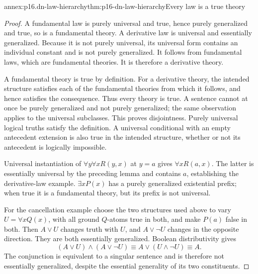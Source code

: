 \begin{annexitem}{annex:p16.dn-law-hierarchy}{thm:p16-dn-law-hierarchy}{Every law is a true theory}
\begin{proof}
A fundamental law is purely universal and true,
hence purely generalized and true, so is a
fundamental theory. A derivative law is
universal and essentially generalized.
Because it is not purely universal, its
universal form contains an individual constant
and is not purely generalized. It follows
from fundamental laws, which are fundamental
theories. It is therefore a derivative theory.

A fundamental theory is true by definition.
For a derivative theory, the intended structure
satisfies each of the fundamental theories
from which it follows, and hence satisfies
the consequence. Thus every theory is true.
A sentence cannot at once be purely
generalized and not purely generalized;
the same observation applies to the
universal subclasses. This proves disjointness.
Purely universal logical truths satisfy
the definition. A universal conditional
with an empty antecedent extension is
also true in the intended structure,
whether or not its antecedent is
logically impossible.

Universal instantiation of
\(\forall y\forall xR(y,x)\) at \(y=a\)
gives \(\forall xR(a,x)\). The latter
is essentially universal by the preceding
lemma and contains \(a\), establishing
the derivative-law example.
\(\exists xP(x)\) has a purely generalized
existential prefix; when true it is a
fundamental theory, but its prefix is
not universal.

For the cancellation example choose the
two structures used above to vary
\(U=\forall xQ(x)\), with all ground
\(Q\)-atoms true in both, and make
\(P(a)\) false in both. Then \(A\lor U\)
changes truth with \(U\), and \(A\lor\neg U\)
changes in the opposite direction.
They are both essentially generalized.
Boolean distributivity gives
\[
 (A\lor U)\land(A\lor\neg U)
          \equiv A\lor(U\land\neg U)\equiv A .
\]
The conjunction is equivalent to a singular
sentence and is therefore not essentially
generalized, despite the essential generality
of its two constituents.
\end{proof}
\end{annexitem}

